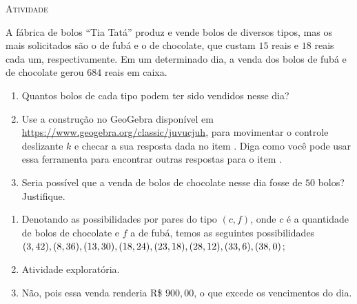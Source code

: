 \documentclass[10 pt,usenames,dvipsnames, oneside]{article}
\begin{document}
\bigskip
\begin{center}
{\large \scshape Atividade}
\end{center}
\fi

A fábrica de bolos “Tia Tatá”{} produz e vende bolos de diversos tipos, mas os mais solicitados são o de fubá e o de chocolate, que custam $15$ reais e $18$ reais cada um, respectivamente. Em um determinado dia, a venda dos bolos de fubá e de chocolate gerou $684$ reais em caixa.

\begin{enumerate}

\item{}
Quantos bolos de cada tipo podem ter sido vendidos nesse dia?

\item{}
Use a construção no GeoGebra disponível em \url{https://www.geogebra.org/classic/juvucjuh}, para movimentar o controle deslizante $k$ e checar a sua resposta dada no item . Diga como você pode usar essa ferramenta para encontrar outras respostas para o item .

\item{}
Seria possível que a venda de bolos de chocolate nesse dia fosse de $50$ bolos? Justifique.
\end{enumerate}

\ifdefined\prof
\clearpage
\begin{solucao}

\begin{enumerate}
\item Denotando as possibilidades por pares do tipo $(c,f)$, onde $c$ é a quantidade de bolos de chocolate e $f$ a de fubá, temos as seguintes possibilidades $(3,42), (8,36), (13,30), \newline (18,24), (23,18), (28,12), \newline(33,6),(38,0)$;
\item Atividade exploratória.
\item Não, pois essa venda renderia R\$ $900{,}00$, o que excede os vencimentos do dia.
\end{enumerate}

\end{solucao}
\fi
\end{document}
